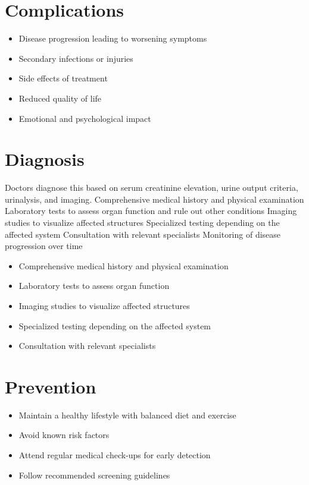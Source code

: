 \section{Complications}
\begin{itemize}[noitemsep]
  \item Disease progression leading to worsening symptoms
  \item Secondary infections or injuries
  \item Side effects of treatment
  \item Reduced quality of life
  \item Emotional and psychological impact
\end{itemize}
\section{Diagnosis}
Doctors diagnose this based on serum creatinine elevation, urine output criteria, urinalysis, and imaging. Comprehensive medical history and physical examination Laboratory tests to assess organ function and rule out other conditions Imaging studies to visualize affected structures Specialized testing depending on the affected system Consultation with relevant specialists Monitoring of disease progression over time

\begin{itemize}[noitemsep]
  \item Comprehensive medical history and physical examination
  \item Laboratory tests to assess organ function
  \item Imaging studies to visualize affected structures
  \item Specialized testing depending on the affected system
  \item Consultation with relevant specialists
\end{itemize}
\section{Prevention}
\begin{itemize}[noitemsep]
  \item Maintain a healthy lifestyle with balanced diet and exercise
  \item Avoid known risk factors
  \item Attend regular medical check-ups for early detection
  \item Follow recommended screening guidelines
\end{itemize}
